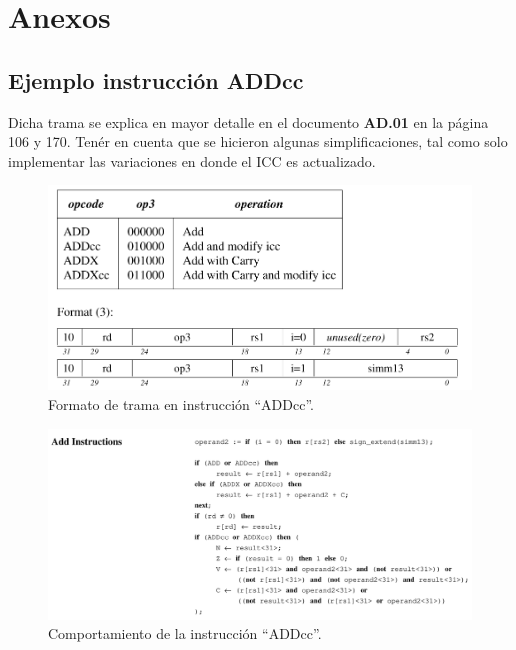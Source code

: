 \documentclass[
  11pt, %
  codirector, %
]{charter}
\begin{document}
\vspace{25px}

\section{Anexos}

\subsection{Ejemplo instrucción ADDcc}
Dicha trama se explica en mayor detalle en el documento \textbf{AD.01} en la página 106 y 170. Tenér en cuenta que se hicieron algunas simplificaciones, tal como solo implementar las variaciones en donde el ICC es actualizado.

\begin{figure}[htpb]
  \centering
  \includegraphics[width=.8\textwidth]{./Figuras/addcc-format.png}
  \caption{Formato de trama en instrucción ``ADDcc''.}
  \label{fig:addcc-format}
\end{figure}

\vspace{25px}
\newpage

\begin{figure}[htpb]
  \centering
  \includegraphics[width=1\textwidth]{./Figuras/addcc-logic.png}
  \caption{Comportamiento de la instrucción ``ADDcc''.}
  \label{fig:addcc-logic}
\end{figure}

\vspace{25px}
\end{document}
